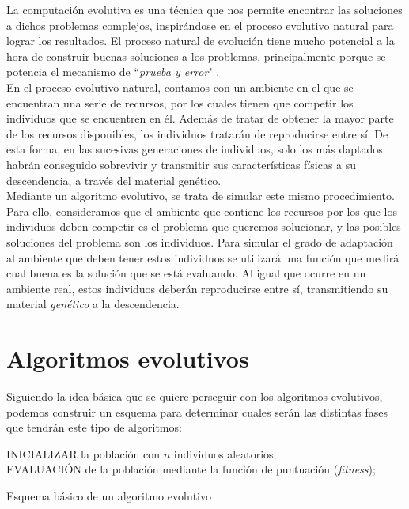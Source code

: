 La computación evolutiva es una técnica que nos permite encontrar las soluciones a dichos problemas complejos, inspirándose en el proceso evolutivo natural para lograr los resultados. El proceso natural de evolución tiene mucho potencial a la hora de construir buenas soluciones a los problemas, principalmente porque se potencia el mecanismo de ``\textit{prueba y error}" \cite{holland1973genetic}. \\

En el proceso evolutivo natural, contamos con un ambiente en el que se encuentran una serie de recursos, por los cuales tienen que competir los individuos que se encuentren en él. Además de tratar de obtener la mayor parte de los recursos disponibles, los individuos tratarán de reproducirse entre sí. De esta forma, en las sucesivas generaciones de individuos, solo los más daptados habrán conseguido sobrevivir y transmitir sus características físicas a su descendencia, a través del material genético. \\

Mediante un algoritmo evolutivo, se trata de simular este mismo procedimiento. Para ello, consideramos que el ambiente que contiene los recursos por los que los individuos deben competir es el problema que queremos solucionar, y las posibles soluciones del problema son los individuos. Para simular el grado de adaptación al ambiente que deben tener estos individuos se utilizará una función que medirá cual buena es la solución que se está evaluando. Al igual que ocurre en un ambiente real, estos individuos deberán reproducirse entre sí, transmitiendo su material \textit{genético} a la descendencia. \\

\section{Algoritmos evolutivos}
\label{1:sec:3}

Siguiendo la idea básica que se quiere perseguir con los algoritmos evolutivos, podemos construir un esquema para determinar cuales serán las distintas fases que tendrán este tipo de algoritmos:

\begin{algorithm}[H]
 INICIALIZAR la población con $n$ individuos aleatorios;\\
 EVALUACIÓN de la población mediante la función de puntuación (\textit{fitness});
 
 \caption{Esquema básico de un algoritmo evolutivo}
\end{algorithm}

